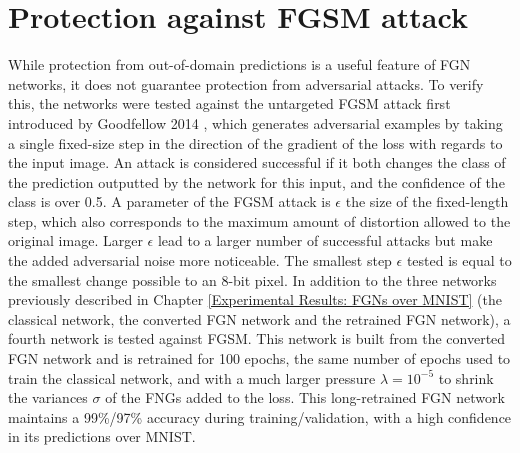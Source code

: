 \documentclass[12pt,oneside]{CUNY_PhD}
\begin{document}
\section{Protection against FGSM attack}
While protection from out-of-domain predictions is a useful feature of FGN networks, it does not guarantee protection from adversarial attacks. To verify this, the networks were tested against the untargeted FGSM attack first introduced by Goodfellow 2014 \cite{goodfellow2015explaining}, which generates adversarial examples by taking a single fixed-size step in the direction of the gradient of the loss with regards to the input image. An attack is considered successful if it both changes the class of the prediction outputted by the network for this input, and the confidence of the class is over 0.5. A parameter of the FGSM attack is $\epsilon$ the size of the fixed-length step, which also corresponds to the maximum amount of distortion allowed to the original image. Larger $\epsilon$ lead to a larger number of successful attacks but make the added adversarial noise more noticeable. The smallest step $\epsilon$ tested is equal to the smallest change possible to an 8-bit pixel. In addition to the three networks previously described in Chapter \ref{Experimental Results: FGNs over MNIST} (the classical network, the converted FGN network and the retrained FGN network), a fourth network is tested against FGSM. This network is built from the converted FGN network and is retrained for 100 epochs, the same number of epochs used to train the classical network, and with a much larger pressure $\lambda=10^{-5}$ to shrink the variances $\sigma$ of the FNGs added to the loss. This long-retrained FGN network maintains a 99\%/97\% accuracy during training/validation, with a high confidence in its predictions over MNIST.
\end{document}
